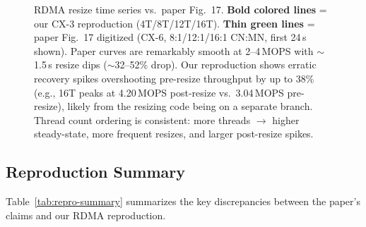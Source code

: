 \documentclass[conference]{IEEEtran}
\begin{document}
\begin{figure}[H]
\caption{RDMA resize time series vs.\ paper Fig.~17. \textbf{Bold colored lines} = our CX-3 reproduction (4T/8T/12T/16T). \textbf{Thin green lines} = paper Fig.~17 digitized (CX-6, 8:1/12:1/16:1 CN:MN, first 24\,s shown). Paper curves are remarkably smooth at 2--4\,MOPS with $\sim$1.5\,s resize dips ($\sim$32--52\% drop). Our reproduction shows erratic recovery spikes overshooting pre-resize throughput by up to 38\% (e.g., 16T peaks at 4.20\,MOPS post-resize vs.\ 3.04\,MOPS pre-resize), likely from the resizing code being on a separate branch. Thread count ordering is consistent: more threads $\to$ higher steady-state, more frequent resizes, and larger post-resize spikes.}
\label{fig:rdma-resize-ts}
\end{figure}

\subsection{Reproduction Summary}

Table~\ref{tab:repro-summary} summarizes the key discrepancies between the paper's claims and our RDMA reproduction.
\end{document}
